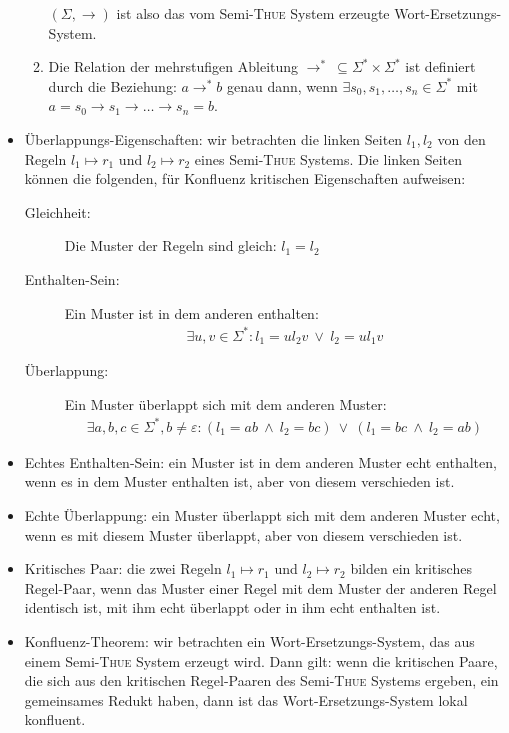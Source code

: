 \documentclass[
  a4paper,
  11pt,
]{scrartcl}
\begin{document}
\begin{itemize}
\begin{enumerate}
        $(\Sigma, \rightarrow)$ ist also das vom Semi-\textsc{Thue} System
        erzeugte Wort-Ersetzungs-System.

      \item Die Relation der mehrstufigen Ableitung $\rightarrow^* \ \subseteq
        \Sigma^* \times \Sigma^*$ ist definiert durch die Beziehung: $a
        \rightarrow^* b$ genau dann, wenn $\exists s_0, s_1, \dots, s_n \in
        \Sigma^*$ mit $a = s_0 \rightarrow s_1 \rightarrow \dots \rightarrow s_n
        = b$.
    \end{enumerate}

  \item Überlappungs-Eigenschaften: wir betrachten die linken Seiten $l_1, l_2$
    von den Regeln $l_1 \mapsto r_1$ und $l_2 \mapsto r_2$ eines
    Semi-\textsc{Thue} Systems. Die linken Seiten können die folgenden, für
    Konfluenz kritischen Eigenschaften aufweisen:
    \begin{description}
      \item[Gleichheit:] Die Muster der Regeln sind gleich: $l_1 = l_2$
      \item[Enthalten-Sein:] Ein Muster ist in dem anderen enthalten:
        \begin{align*}
          \exists u,v \in \Sigma^*: l_1 = u l_2 v \ \vee \ l_2 = u l_1 v
        \end{align*}
      \item[Überlappung:] Ein Muster überlappt sich mit dem anderen Muster:
        \begin{align*}
          \exists a,b,c \in \Sigma^*, b \neq \varepsilon:
          (l_1 = ab \ \wedge \ l_2 = bc) \ \vee \ (l_1 = bc \ \wedge \ l_2 = ab)
        \end{align*}
    \end{description}

  \item Echtes Enthalten-Sein: ein Muster ist in dem anderen Muster echt
    enthalten, wenn es in dem Muster enthalten ist, aber von diesem verschieden
    ist.

  \item Echte Überlappung: ein Muster überlappt sich mit dem anderen Muster
    echt, wenn es mit diesem Muster überlappt, aber von diesem verschieden ist.

  \item Kritisches Paar: die zwei Regeln $l_1 \mapsto r_1$ und $l_2 \mapsto r_2$
    bilden ein kritisches Regel-Paar, wenn das Muster einer Regel mit dem Muster
    der anderen Regel identisch ist, mit ihm echt überlappt oder in ihm echt
    enthalten ist.

  \item Konfluenz-Theorem: wir betrachten ein Wort-Ersetzungs-System, das aus
    einem Semi-\textsc{Thue} System erzeugt wird. Dann gilt: wenn die kritischen
    Paare, die sich aus den kritischen Regel-Paaren des Semi-\textsc{Thue}
    Systems ergeben, ein gemeinsames Redukt haben, dann ist das
    Wort-Ersetzungs-System lokal konfluent.
\end{itemize}
\end{document}
